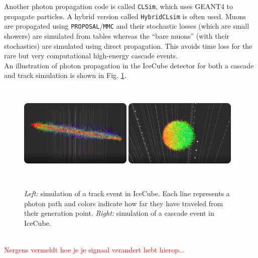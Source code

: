 \noindent Another photon propagation code is called \texttt{CLSim}, which uses GEANT4 to propagate particles. A hybrid version called \texttt{HybridCLsim} is often used. Muons are propagated using \texttt{PROPOSAL}/\texttt{MMC}  and their stochastic losses (which are small showers) are simulated from tables whereas the ``bare muons'' (with their stochastics) are simulated using direct propagation. This avoids time loss for the rare but very computational high-energy cascade events.\\

\noindent An illustration of photon propagation in the IceCube detector for both a cascade and track simulation is shown in Fig. \ref{fig:photonsimulation}.

\begin{figure}
\centering
\includegraphics[width=0.48\textwidth,height=1.9in]{chapter6/img/photons_track_rounded.png}
\includegraphics[width=0.48\textwidth,height=1.9in]{chapter6/img/photons_cascade_rounded.png}
\caption{\textit{Left:} simulation of a track event in IceCube. Each line represents a photon path and colors indicate how far they have traveled from their generation point. \textit{Right:} simulation of a cascade event in IceCube.}
\label{fig:photonsimulation}
\end{figure}

\textcolor{red}{\\Nergens vermeldt hoe je je signaal verandert hebt hierop...\\}

